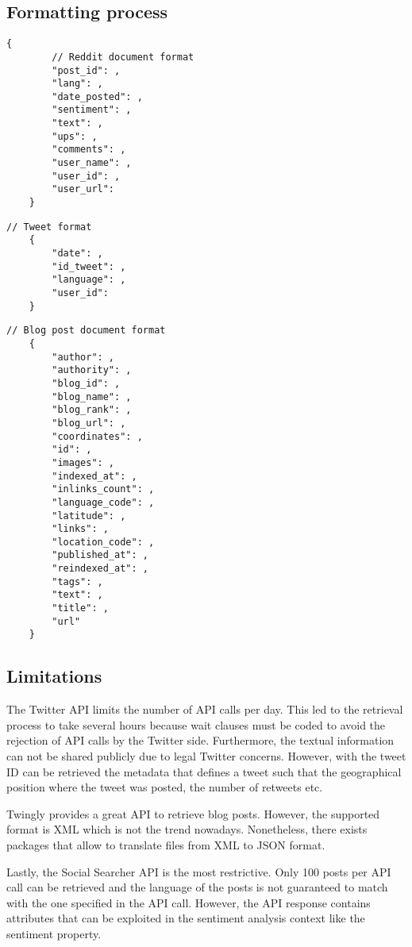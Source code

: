 \subsection{Formatting process}

\begin{Verbatim}[xleftmargin=.5in]
	{
		// Reddit document format
		"post_id": ,
		"lang": ,
		"date_posted": ,
		"sentiment": ,
		"text": ,
		"ups": ,
		"comments": ,
		"user_name": ,
		"user_id": ,
		"user_url": 
	}
\end{Verbatim}

\begin{Verbatim}[xleftmargin=.5in]
	// Tweet format
	{
		"date": ,
		"id_tweet": ,
		"language": ,
		"user_id": 
	}
\end{Verbatim}

\begin{Verbatim}[xleftmargin=.5in]
	// Blog post document format
	{
		"author": ,
		"authority": ,
		"blog_id": ,
		"blog_name": ,
		"blog_rank": ,
		"blog_url": ,
		"coordinates": ,
		"id": ,
		"images": ,
		"indexed_at": ,
		"inlinks_count": ,
		"language_code": ,
		"latitude": ,
		"links": ,
		"location_code": ,
		"published_at": ,
		"reindexed_at": ,
		"tags": ,
		"text": ,
		"title": ,
		"url"
	}
\end{Verbatim}
\subsection{Limitations}

The Twitter API limits the number of API calls per day. This led to the retrieval process to take several hours because wait clauses must be coded to avoid the rejection of API calls by the Twitter side. Furthermore, the textual information can not be shared publicly due to legal Twitter concerns. However, with the tweet ID can be retrieved the metadata that defines a tweet such that the geographical position where the tweet was posted, the number of retweets etc. \\

\par Twingly provides a great API to retrieve blog posts. However, the supported format is XML which is not the trend nowadays. Nonetheless, there exists packages that allow to translate files from XML to JSON format.
\par Lastly, the Social Searcher API is the most restrictive. Only 100 posts per API call can be retrieved and the language of the posts is not guaranteed to match with the one specified in the API call. However, the API response contains attributes that can be exploited in the sentiment analysis context like the sentiment property.


